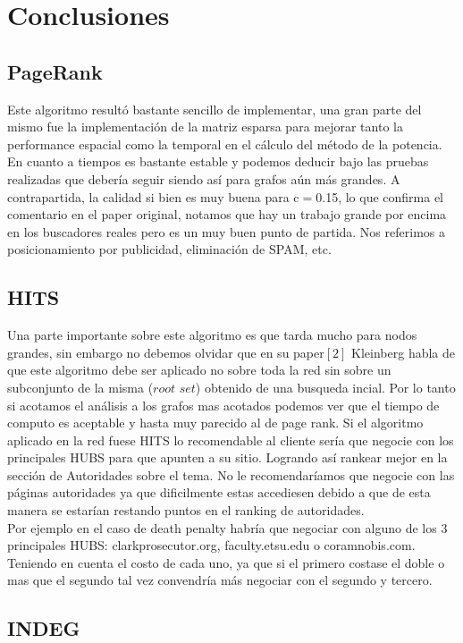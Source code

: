 
\section{Conclusiones}

\subsection{PageRank}
Este algoritmo resultó bastante sencillo de implementar, una gran parte del mismo fue la implementación de la matriz esparsa para mejorar tanto la performance espacial como la temporal en el cálculo del método de la potencia. \\
En cuanto a tiempos es bastante estable y podemos deducir bajo las pruebas realizadas que debería seguir siendo así para grafos aún más grandes. A contrapartida, la calidad si bien es muy buena para c$=$0.15, lo que confirma el comentario en el paper original, notamos que hay un trabajo grande por encima en los buscadores reales pero es un muy buen punto de partida. Nos referimos a posicionamiento por publicidad, eliminación de SPAM, etc.

\subsection{HITS}

Una parte importante sobre este algoritmo es que tarda mucho para nodos grandes, sin embargo no debemos olvidar que en su paper$[2]$ Kleinberg habla de que este algoritmo debe ser aplicado no sobre toda la red sin sobre un subconjunto de la misma ($\textit{root set}$) obtenido de una busqueda incial. Por lo tanto si acotamos el análisis a los grafos mas acotados podemos ver que el tiempo de computo es aceptable y hasta muy parecido al de page rank. 
Si el algoritmo aplicado en la red fuese HITS lo recomendable al cliente sería que negocie con los principales HUBS para que apunten a su sitio. Logrando así rankear mejor en la sección de Autoridades sobre el tema. 
No le recomendaríamos que negocie con las páginas autoridades ya que dificilmente estas accediesen debido a que de esta manera se estarían restando puntos en el ranking de autoridades.\\
Por ejemplo en el caso de death penalty habría que negociar con alguno de los 3 principales HUBS: clarkprosecutor.org, faculty.etsu.edu o coramnobis.com. Teniendo en cuenta el costo de cada uno, ya que si el primero costase el doble 
o mas que el segundo tal vez convendría más negociar con el segundo y tercero.
\subsection{INDEG}

